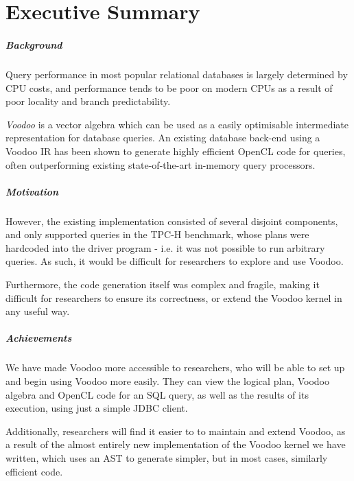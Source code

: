 \chapter{Executive Summary}

\paragraph{Background}

Query performance in most popular relational databases is largely determined by CPU costs, and performance tends to be poor on modern CPUs as a result of poor locality and branch predictability.

\emph{Voodoo} \cite{Pirk:2016:VVA:3007328.3007336} is a vector algebra which can be used as a easily optimisable intermediate representation for database queries. An existing database back-end using a Voodoo IR has been shown to generate highly efficient OpenCL code for queries, often outperforming existing state-of-the-art in-memory query processors.

\paragraph{Motivation}

However, the existing implementation consisted of several disjoint components, and only supported queries in the TPC-H benchmark, whose plans were hardcoded into the driver program - i.e. it was not possible to run arbitrary queries. As such, it would be difficult for researchers to explore and use Voodoo.

Furthermore, the code generation itself was complex and fragile, making it difficult for researchers to ensure its correctness, or extend the Voodoo kernel in any useful way.

\paragraph{Achievements}

We have made Voodoo more accessible to researchers, who will be able to set up and begin using Voodoo more easily. They can view the logical plan, Voodoo algebra and OpenCL code for an SQL query, as well as the results of its execution, using just a simple JDBC client.

Additionally, researchers will find it easier to to maintain and extend Voodoo, as a result of the almost entirely new implementation of the Voodoo kernel we have written, which uses an AST to generate simpler, but in most cases, similarly efficient code.

